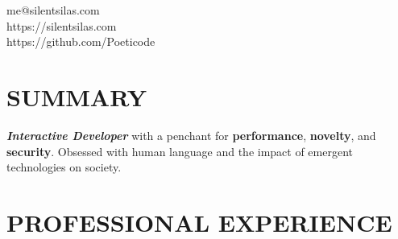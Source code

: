 \documentclass[margin,line]{resume}
\begin{document}
{
    \hfill me@silentsilas.com       \vspace{0mm}\\\vspace{0mm}%
    \hfill https://silentsilas.com           \vspace{0mm}\\\vspace{0mm}%
    \hfill https://github.com/Poeticode \vspace{0mm}\\\vspace{-9mm}%
}

\begin{resume}

    \vspace{-3mm}

    \section{\mysidestyle \textbf{\large{S}\small{UMMARY}}}

    \textbf{\textsl{Interactive Developer}} with a penchant for \textbf{performance}, \textbf{novelty}, and \textbf{security}. Obsessed with human language and the impact of emergent technologies on society. 

    \vspace{-1mm}

\sectionline

    \section{\mysidestyle \textbf{\large{P}\small{ROFESSIONAL} \large{E}\small{XPERIENCE}}}


\end{resume}
\end{document}
